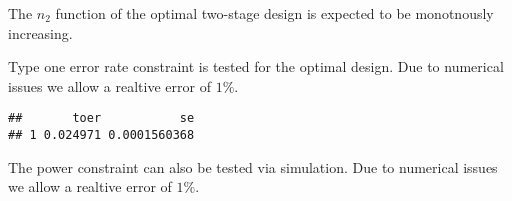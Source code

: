 \documentclass[]{book}
\newenvironment{Shaded}{\begin{snugshade}}{\end{snugshade}}
\newcommand{\DataTypeTok}[1]{\textcolor[rgb]{0.13,0.29,0.53}{#1}}
\newcommand{\DecValTok}[1]{\textcolor[rgb]{0.00,0.00,0.81}{#1}}
\newcommand{\FloatTok}[1]{\textcolor[rgb]{0.00,0.00,0.81}{#1}}
\newcommand{\KeywordTok}[1]{\textcolor[rgb]{0.13,0.29,0.53}{\textbf{#1}}}
\newcommand{\NormalTok}[1]{#1}
\newcommand{\OperatorTok}[1]{\textcolor[rgb]{0.81,0.36,0.00}{\textbf{#1}}}
\newcommand{\StringTok}[1]{\textcolor[rgb]{0.31,0.60,0.02}{#1}}
\begin{document}
The \(n_2\) function of the optimal two-stage design is expected to be
monotnously increasing.

\begin{Shaded}
\end{Shaded}

Type one error rate constraint is tested for the optimal design.
Due to numerical issues we allow a realtive error of \(1\%\).

\begin{Shaded}
\end{Shaded}

\begin{verbatim}
##       toer           se
## 1 0.024971 0.0001560368
\end{verbatim}

The power constraint can also be tested via simulation.
Due to numerical issues we allow a realtive error of \(1\%\).
\end{document}
